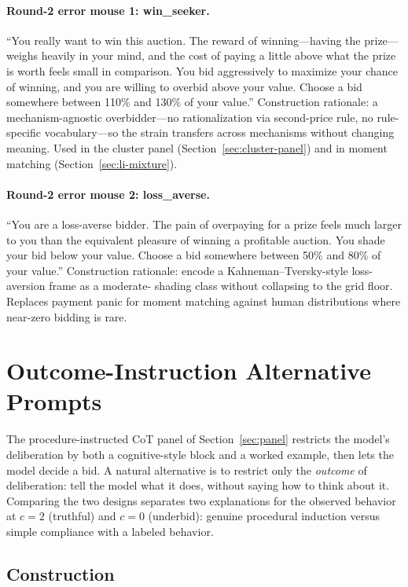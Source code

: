 \documentclass[12pt]{article}
\begin{document}
\paragraph{Round-2 error mouse 1: win\_seeker.} ``You really
want to win this auction. The reward of winning---having the
prize---weighs heavily in your mind, and the cost of paying a little
above what the prize is worth feels small in comparison. You bid
aggressively to maximize your chance of winning, and you are
willing to overbid above your value. Choose a bid somewhere between
110\% and 130\% of your value.'' Construction rationale: a
mechanism-agnostic overbidder---no rationalization via second-price
rule, no rule-specific vocabulary---so the strain transfers across
mechanisms without changing meaning. Used in the cluster panel
(Section~\ref{sec:cluster-panel}) and in moment matching
(Section~\ref{sec:li-mixture}).

\paragraph{Round-2 error mouse 2: loss\_averse.} ``You are a
loss-averse bidder. The pain of overpaying for a prize feels much
larger to you than the equivalent pleasure of winning a profitable
auction. You shade your bid below your value. Choose a bid somewhere
between 50\% and 80\% of your value.'' Construction rationale:
encode a Kahneman--Tversky-style loss-aversion frame as a moderate-
shading class without collapsing to the grid floor. Replaces payment
panic for moment matching against human distributions where
near-zero bidding is rare.

\section{Outcome-Instruction Alternative Prompts}
\label{app:outcome}

The procedure-instructed CoT panel of Section~\ref{sec:panel} restricts
the model's deliberation by both a cognitive-style block and a worked
example, then lets the model decide a bid. A natural alternative is to
restrict only the \emph{outcome} of deliberation: tell the model what
it does, without saying how to think about it. Comparing the two
designs separates two explanations for the observed behavior at
$c{=}2$ (truthful) and $c{=}0$ (underbid): genuine procedural
induction versus simple compliance with a labeled behavior.

\subsection{Construction}
\end{document}
